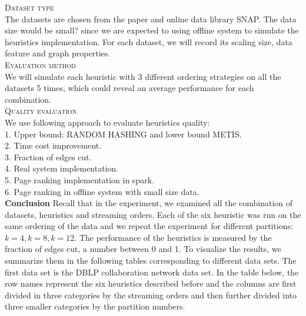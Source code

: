 \documentclass[12pt]{article}
\begin{document}
\textsc{Dataset type}\\
The datasets are chosen from the paper and online data library SNAP. The data size would be small? since we are expected to using offline system to simulate the heuristics implementation. For each dataset, we will record its scaling size, data feature and graph properties.\\
\textsc{Evaluation method}\\
We will simulate each heuristic with 3 different ordering strategies on all the datasets 5 times, which could reveal an average performance for each combination.\\
\textsc{Quality evaluation}\\
We use following approach to evaluate heuristics quality:\\
1. Upper bound: RANDOM HASHING and lower bound METIS.\\
2. Time cost improvement.\\
3. Fraction of edges cut.\\
4. Real system implementation.\\
5. Page ranking implementation in spark.\\
6. Page ranking in offline system with small size data.\\

\textbf{Conclusion}
Recall that in the experiment, we examined all the combination of datasets, heuristics and streaming orders. Each of the six heuristic was run on the same ordering of the data and we repeat the experiment for different partitions: $k=4, k=8, k=12$. The performance of the heuristics is measured by the fraction of edges cut, a number between 0 and 1. To visualize the results, we summarize them in the following tables corresponding to different data sets. The first data set is the DBLP collaboration network data set. In the table below, the row names represent the six heuristics described before and the columns are first divided in three categories by the streaming orders and then further divided into three smaller categories by the partition numbers.  \\
\end{document}
